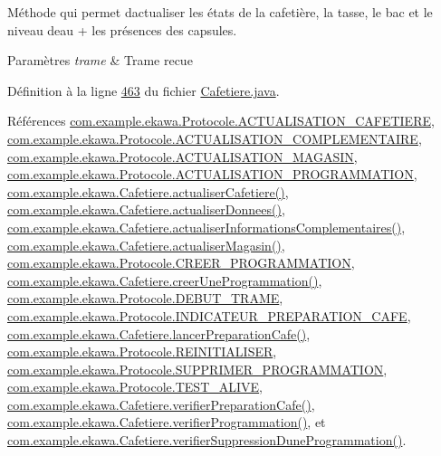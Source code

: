 Méthode qui permet d\textquotesingle{}actualiser les états de la cafetière, la tasse, le bac et le niveau d\textquotesingle{}eau + les présences des capsules. 


\begin{DoxyParams}{Paramètres}
{\em trame} & Trame recue \\
\hline
\end{DoxyParams}


Définition à la ligne \hyperlink{_cafetiere_8java_source_l00463}{463} du fichier \hyperlink{_cafetiere_8java_source}{Cafetiere.\+java}.



Références \hyperlink{_protocole_8java_source_l00034}{com.\+example.\+ekawa.\+Protocole.\+A\+C\+T\+U\+A\+L\+I\+S\+A\+T\+I\+O\+N\+\_\+\+C\+A\+F\+E\+T\+I\+E\+RE}, \hyperlink{_protocole_8java_source_l00036}{com.\+example.\+ekawa.\+Protocole.\+A\+C\+T\+U\+A\+L\+I\+S\+A\+T\+I\+O\+N\+\_\+\+C\+O\+M\+P\+L\+E\+M\+E\+N\+T\+A\+I\+RE}, \hyperlink{_protocole_8java_source_l00035}{com.\+example.\+ekawa.\+Protocole.\+A\+C\+T\+U\+A\+L\+I\+S\+A\+T\+I\+O\+N\+\_\+\+M\+A\+G\+A\+S\+IN}, \hyperlink{_protocole_8java_source_l00037}{com.\+example.\+ekawa.\+Protocole.\+A\+C\+T\+U\+A\+L\+I\+S\+A\+T\+I\+O\+N\+\_\+\+P\+R\+O\+G\+R\+A\+M\+M\+A\+T\+I\+ON}, \hyperlink{_cafetiere_8java_source_l00543}{com.\+example.\+ekawa.\+Cafetiere.\+actualiser\+Cafetiere()}, \hyperlink{_cafetiere_8java_source_l00495}{com.\+example.\+ekawa.\+Cafetiere.\+actualiser\+Donnees()}, \hyperlink{_cafetiere_8java_source_l00574}{com.\+example.\+ekawa.\+Cafetiere.\+actualiser\+Informations\+Complementaires()}, \hyperlink{_cafetiere_8java_source_l00561}{com.\+example.\+ekawa.\+Cafetiere.\+actualiser\+Magasin()}, \hyperlink{_protocole_8java_source_l00032}{com.\+example.\+ekawa.\+Protocole.\+C\+R\+E\+E\+R\+\_\+\+P\+R\+O\+G\+R\+A\+M\+M\+A\+T\+I\+ON}, \hyperlink{_cafetiere_8java_source_l00731}{com.\+example.\+ekawa.\+Cafetiere.\+creer\+Une\+Programmation()}, \hyperlink{_protocole_8java_source_l00025}{com.\+example.\+ekawa.\+Protocole.\+D\+E\+B\+U\+T\+\_\+\+T\+R\+A\+ME}, \hyperlink{_protocole_8java_source_l00030}{com.\+example.\+ekawa.\+Protocole.\+I\+N\+D\+I\+C\+A\+T\+E\+U\+R\+\_\+\+P\+R\+E\+P\+A\+R\+A\+T\+I\+O\+N\+\_\+\+C\+A\+FE}, \hyperlink{_cafetiere_8java_source_l00527}{com.\+example.\+ekawa.\+Cafetiere.\+lancer\+Preparation\+Cafe()}, \hyperlink{_protocole_8java_source_l00031}{com.\+example.\+ekawa.\+Protocole.\+R\+E\+I\+N\+I\+T\+I\+A\+L\+I\+S\+ER}, \hyperlink{_protocole_8java_source_l00033}{com.\+example.\+ekawa.\+Protocole.\+S\+U\+P\+P\+R\+I\+M\+E\+R\+\_\+\+P\+R\+O\+G\+R\+A\+M\+M\+A\+T\+I\+ON}, \hyperlink{_protocole_8java_source_l00029}{com.\+example.\+ekawa.\+Protocole.\+T\+E\+S\+T\+\_\+\+A\+L\+I\+VE}, \hyperlink{_cafetiere_8java_source_l00509}{com.\+example.\+ekawa.\+Cafetiere.\+verifier\+Preparation\+Cafe()}, \hyperlink{_cafetiere_8java_source_l00606}{com.\+example.\+ekawa.\+Cafetiere.\+verifier\+Programmation()}, et \hyperlink{_cafetiere_8java_source_l00804}{com.\+example.\+ekawa.\+Cafetiere.\+verifier\+Suppression\+Dune\+Programmation()}.


